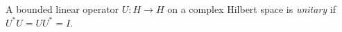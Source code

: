 
A bounded linear operator $U:H\to H$ on a complex Hilbert space is \emph{unitary} if $U^*U=UU^*=I$.

